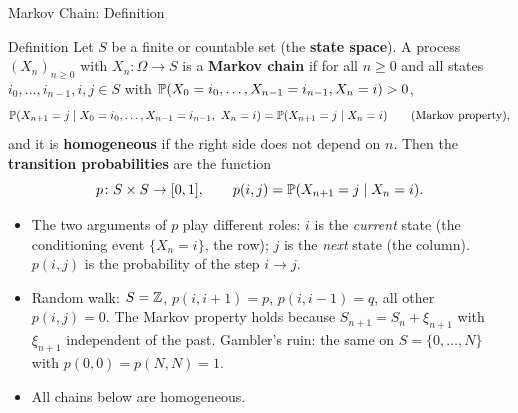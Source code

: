 \begin{frame}{Markov Chain: Definition}
  \label{fr:mcdef}
  \small
  \begin{block}{Definition}
    Let $S$ be a finite or countable set (the \textbf{state space}). A process $(X_n)_{n\ge0}$ with $X_n\colon\Omega\to S$ is a \textbf{Markov chain} if for all $n\ge0$ and all states $i_0,\dots,i_{n-1},i,j\in S$ with $\mathbb{P}(X_0=i_0,\dots,X_{n-1}=i_{n-1},X_n=i)>0$,
    \[
      \mathbb{P}(X_{n+1}=j\mid X_0=i_0,\dots,X_{n-1}=i_{n-1},\ X_n=i)=\mathbb{P}(X_{n+1}=j\mid X_n=i)\qquad\text{(Markov property)},
    \]
    and it is \textbf{homogeneous} if the right side does not depend on $n$. Then the \textbf{transition probabilities} are the function
    \[
      p\colon S\times S\to[0,1],\qquad p(i,j)=\mathbb{P}(X_{n+1}=j\mid X_n=i).
    \]
  \end{block}
  \begin{itemize}
    \item The two arguments of $p$ play different roles: $i$ is the \emph{current} state (the conditioning event $\{X_n=i\}$, the row); $j$ is the \emph{next} state (the column). $p(i,j)$ is the probability of the step $i\to j$.
    \item Random walk: $S=\mathbb{Z}$, $p(i,i+1)=p$, $p(i,i-1)=q$, all other $p(i,j)=0$. The Markov property holds because $S_{n+1}=S_n+\xi_{n+1}$ with $\xi_{n+1}$ independent of the past. Gambler's ruin: the same on $S=\{0,\dots,N\}$ with $p(0,0)=p(N,N)=1$.
    \item All chains below are homogeneous.
  \end{itemize}
\end{frame}

